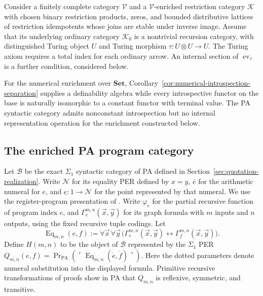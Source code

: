 \documentclass[11pt]{article}
\theoremstyle{definition}
\theoremstyle{remark}
\begin{document}
Consider a finitely complete category $\mathscr V$ and a
$\mathscr V$-enriched restriction category $\mathcal K$ with
chosen binary restriction products, zeros, and bounded distributive
lattices of restriction idempotents whose joins are stable under inverse image.
Assume that its underlying ordinary category $\mathcal K_0$ is a nontrivial
recursion category, with distinguished Turing object $U$ and Turing
morphism $\tau:U\otimes U\to U$.
The Turing axiom requires a total index for each ordinary arrow.
An internal section of $\operatorname{ev}_\tau$ is a further
condition, considered below.

For the numerical enrichment over $\mathbf{Set}$,
Corollary~\ref{cor:numerical-introspection-separation} supplies a
definability algebra while every introspective functor on the base
is naturally isomorphic to a constant functor with terminal value.
The PA syntactic category admits nonconstant introspection but
no internal representation operation for the enrichment
constructed below.

\subsection{The enriched PA program category}

Let $\mathcal B$ be the exact $\Sigma_1$ syntactic category of PA
defined in Section~\ref{sec:quotation-realization}.
Write $\mathcal N$ for its equality PER defined by $x=y$,
$\bar e$ for the arithmetic numeral for $e$, and
$\underline e:1\to\mathcal N$ for the point represented by
that numeral. We use the register-program
presentation of \cite[Section~7]{RecursionCompletions}.
Write $\varphi_e$ for the partial recursive function of program
index $e$, and $\Gamma_e^{m,n}(\vec x,\vec y)$ for its graph formula
with $m$ inputs and $n$ outputs, using the fixed recursive tuple
codings. Let
\[
 \operatorname{Eq}_{m,n}(e,f)
 :=\forall\vec x\,\forall\vec y\,
   \bigl(\Gamma_e^{m,n}(\vec x,\vec y)
             \leftrightarrow\Gamma_f^{m,n}(\vec x,\vec y)\bigr).
\]
Define $H(m,n)$ to be the object of $\mathcal B$ represented by
the $\Sigma_1$ PER
$Q_{m,n}(e,f)=\operatorname{Pr}_{\mathrm{PA}}
(\ulcorner\operatorname{Eq}_{m,n}(\dot e,\dot f)\urcorner)$.
Here the dotted parameters denote numeral substitution into the
displayed formula. Primitive recursive transformations of proofs
show in PA that $Q_{m,n}$ is reflexive, symmetric, and transitive.
\end{document}
